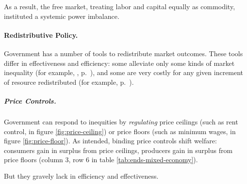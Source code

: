 As a result, the free market, treating labor and capital equally as commodity, instituted a systemic power imbalance.


\paragraph{Redistributive Policy.}  \label{sec:redistributivepolicy} Government has a number of tools to redistribute market outcomes. These tools differ in effectiveness and efficiency: some alleviate only some kinds of market inequality (for example, ,  p.~\pageref{sec:affirmativeaction}), and some are very costly for any given increment of resource redistributed (for example,  p.~\pageref{sec:price-controls}).

\subparagraph{Price Controls.}  \label{sec:price-controls} Government can respond to inequities by \emph{regulating} price ceilings (such as rent control, in figure \ref{fig:price-ceiling}) or price floors (such as minimum wages, in figure \ref{fig:price-floor}). As intended, binding price controls shift welfare: consumers gain in surplus from price ceilings, producers gain in surplus from price floors (column 3, row 6 in table \ref{tab:ends-mixed-economy}).

But they gravely lack in efficiency and effectiveness.

